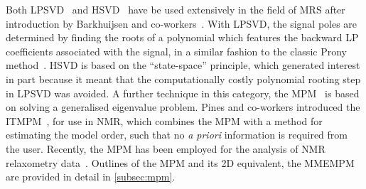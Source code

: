 Both \ac{LPSVD}~\cite{Kumaresan1982,Kumaresan1983} and
\ac{HSVD}~\cite{Kung1983} have be used extensively in the field of \ac{MRS}
after introduction by Barkhuijsen and
co-workers~\cite{Barkhuijsen1985a,Barkhuijsen1985b,Barkhuijsen1987,Beer1988,Pijnappel1992}.
With
\ac{LPSVD}, the signal poles are determined by finding the roots of a
polynomial which features the backward \ac{LP} coefficients associated with the
signal, in a similar fashion to the classic Prony method~\cite{Prony1795}.
\ac{HSVD} is based on the ``state-space'' principle, which generated interest
in part because it meant that the computationally costly polynomial rooting
step in \ac{LPSVD} was avoided.
A further technique in this category, the
\ac{MPM}~\cite{Hua1990,Hua1990b,Hua1991} is based on solving a generalised
eigenvalue problem.  Pines and co-workers introduced the \ac{ITMPM}~\cite{Lin1997},
for use in \ac{NMR}, which combines the \ac{MPM} with a method for estimating
the model order, such that no \textit{a priori} information is required from
the user.  Recently, the \ac{MPM} has been employed for the analysis of
\ac{NMR} relaxometry data~\cite{Fricke2020, Wortge2023}.  Outlines of the
\ac{MPM} and its \ac{2D} equivalent, the \ac{MMEMPM}~\cite{Hua1992,Chen2007} are
provided in detail in \cref{subsec:mpm}.



